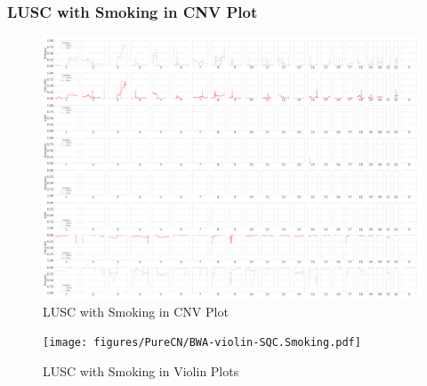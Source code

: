 \documentclass{beamer}
\begin{document}
    \begin{frame}[allowframebreaks]
        \frametitle{LUSC with Smoking in CNV Plot}

        \begin{figure}
            \includegraphics[width=0.6 \linewidth]{figures/PureCN/BWA-simple-SQC.Smoking.pdf}
            \caption{LUSC with Smoking in CNV Plot}
        \end{figure}

        \begin{figure}
            \texttt{[image: figures/PureCN/BWA-violin-SQC.Smoking.pdf]}
            \caption{LUSC with Smoking in Violin Plots}
        \end{figure}
    \end{frame}
\end{document}
